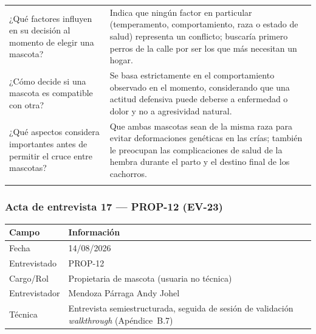 \documentclass[journal,onecolumn]{IEEEtran}
\begin{document}
{\begin{longtable}{@{}p{5.6cm} p{9.4cm}@{}}
			¿Qué factores influyen en su decisión al momento de elegir una mascota? & Indica que ningún factor en particular (temperamento, comportamiento, raza o estado de salud) representa un conflicto; buscaría primero perros de la calle por ser los que más necesitan un hogar. \\ \addlinespace
			
			¿Cómo decide si una mascota es compatible con otra? & Se basa estrictamente en el comportamiento observado en el momento, considerando que una actitud defensiva puede deberse a enfermedad o dolor y no a agresividad natural. \\ \addlinespace
			
			¿Qué aspectos considera importantes antes de permitir el cruce entre mascotas? & Que ambas mascotas sean de la misma raza para evitar deformaciones genéticas en las crías; también le preocupan las complicaciones de salud de la hembra durante el parto y el destino final de los cachorros. \\ \addlinespace
			
		\end{longtable}
	}

	\subsubsection*{Acta de entrevista 17 --- PROP-12 (EV-23)}

	\begin{table}[H]
		\centering\small
		\begin{tabularx}{\textwidth}{@{}l X@{}}
			\toprule
			\textbf{Campo} & \textbf{Información} \\
			\midrule
			
			Fecha & 14/08/2026 \\
			
			Entrevistado & PROP-12 \\
			
			Cargo/Rol & Propietaria de mascota (usuaria no técnica) \\
			
			Entrevistador & Mendoza Párraga Andy Johel \\
			
			Técnica & Entrevista semiestructurada, seguida de sesión de validación \emph{walkthrough} (Apéndice~B.7) \\
			
			\bottomrule
		\end{tabularx}
	\end{table}
\end{document}
